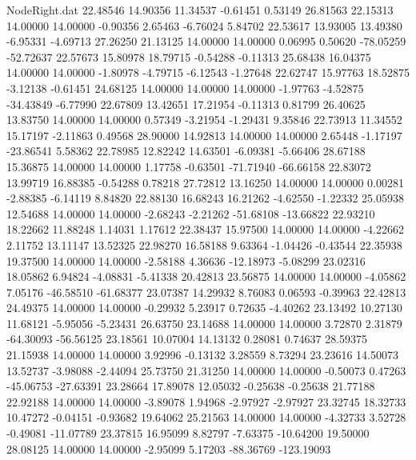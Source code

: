 \begin{filecontents}{NodeRight.dat}
  22.48546   14.90356   11.34537    -0.61451    0.53149   26.81563   22.15313   14.00000   14.00000   -0.90356    2.65463   -6.76024    5.84702
  22.53617   13.93005   13.49380    -6.95331   -4.69713   27.26250   21.13125   14.00000   14.00000    0.06995    0.50620  -78.05259  -52.72637
  22.57673   15.80978   18.79715    -0.54288   -0.11313   25.68438   16.04375   14.00000   14.00000   -1.80978   -4.79715   -6.12543   -1.27648
  22.62747   15.97763   18.52875    -3.12138   -0.61451   24.68125   14.00000   14.00000   14.00000   -1.97763   -4.52875  -34.43849   -6.77990
  22.67809   13.42651   17.21954    -0.11313    0.81799   26.40625   13.83750   14.00000   14.00000    0.57349   -3.21954   -1.29431    9.35846
  22.73913   11.34552   15.17197    -2.11863    0.49568   28.90000   14.92813   14.00000   14.00000    2.65448   -1.17197  -23.86541    5.58362
  22.78985   12.82242   14.63501    -6.09381   -5.66406   28.67188   15.36875   14.00000   14.00000    1.17758   -0.63501  -71.71940  -66.66158
  22.83072   13.99719   16.88385    -0.54288    0.78218   27.72812   13.16250   14.00000   14.00000    0.00281   -2.88385   -6.14119    8.84820
  22.88130   16.68243   16.21262    -4.62550   -1.22332   25.05938   12.54688   14.00000   14.00000   -2.68243   -2.21262  -51.68108  -13.66822
  22.93210   18.22662   11.88248     1.14031    1.17612   22.38437   15.97500   14.00000   14.00000   -4.22662    2.11752   13.11147   13.52325
  22.98270   16.58188    9.63364    -1.04426   -0.43544   22.35938   19.37500   14.00000   14.00000   -2.58188    4.36636  -12.18973   -5.08299
  23.02316   18.05862    6.94824    -4.08831   -5.41338   20.42813   23.56875   14.00000   14.00000   -4.05862    7.05176  -46.58510  -61.68377
  23.07387   14.29932    8.76083     0.06593   -0.39963   22.42813   24.49375   14.00000   14.00000   -0.29932    5.23917    0.72635   -4.40262
  23.13492   10.27130   11.68121    -5.95056   -5.23431   26.63750   23.14688   14.00000   14.00000    3.72870    2.31879  -64.30093  -56.56125
  23.18561   10.07004   14.13132     0.28081    0.74637   28.59375   21.15938   14.00000   14.00000    3.92996   -0.13132    3.28559    8.73294
  23.23616   14.50073   13.52737    -3.98088   -2.44094   25.73750   21.31250   14.00000   14.00000   -0.50073    0.47263  -45.06753  -27.63391
  23.28664   17.89078   12.05032    -0.25638   -0.25638   21.77188   22.92188   14.00000   14.00000   -3.89078    1.94968   -2.97927   -2.97927
  23.32745   18.32733   10.47272    -0.04151   -0.93682   19.64062   25.21563   14.00000   14.00000   -4.32733    3.52728   -0.49081  -11.07789
  23.37815   16.95099    8.82797    -7.63375  -10.64200   19.50000   28.08125   14.00000   14.00000   -2.95099    5.17203  -88.36769 -123.19093

\end{filecontents}
